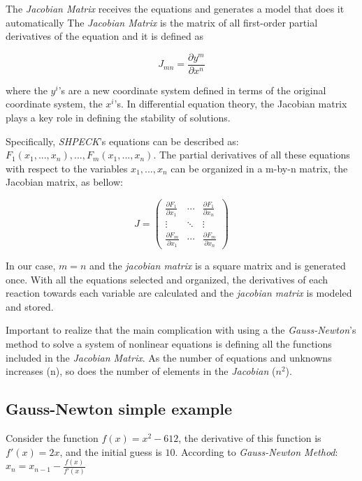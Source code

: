 \documentclass[ppgc,mestrado,english]{iiufrgs}
\begin{document}
The \emph{Jacobian Matrix} receives the equations and generates a model that does it automatically The \emph{Jacobian Matrix} is the matrix of all first-order partial derivatives of the equation and it is defined as

\begin{equation}
\label{eq:JacobianDefinition}
J_{mn} = \frac{\partial y^m}{\partial x^n}
\end{equation}

where the $y^i$'s are a new coordinate system defined in terms of the original coordinate system, the $x^i$'s. In differential equation theory, the Jacobian matrix plays a key role in defining the stability of solutions.

Specifically, \emph{SHPECK}'s equations can be described as: $F_1(x_1,..., x_n),...,F_m(x_1,...,x_n)$. The partial derivatives of all these equations with respect to the variables $x_1,...,x_n$ can be organized in a m-by-n matrix, the Jacobian matrix, as bellow:

\begin{equation} 
J =
 \begin{pmatrix}
  \frac{\partial F_1}{\partial x_1} & \cdots & \frac{\partial F_1}{\partial x_n} \\
  \vdots  & \ddots & \vdots  \\
  \frac{\partial F_m}{\partial x_1} & \cdots &   \frac{\partial F_m}{\partial x_n}
 \end{pmatrix}
\end{equation}

In our case, $m = n$ and the \emph{jacobian matrix} is a square matrix and is generated once. With all the equations selected and organized, the derivatives of each reaction towards each variable are calculated and the \emph{jacobian matrix} is modeled and stored. 

Important to realize that the main complication with using a the \emph{Gauss-Newton}'s method to solve a system of nonlinear equations is defining all the functions included in the \emph{Jacobian Matrix}. As the number of equations and unknowns increases (n), so does the number of elements in the \emph{Jacobian} ($n^2$).


\subsection{Gauss-Newton simple example}
Consider the function $f(x) = x^2 - 612$, the derivative of this function is $f'(x) = 2x$, and the initial guess is $10$. According to \emph{Gauss-Newton Method}: $x_n = x_{n-1} - \frac{f(x)}{f'(x)}$
\end{document}
